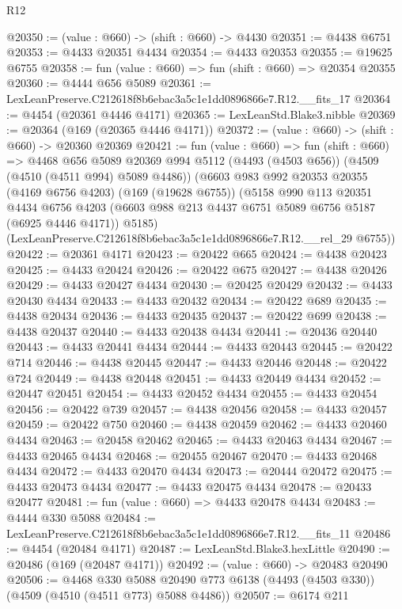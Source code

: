 \begin{lexlean}{R12}
\begin{coremodule}
@20350 := (value : @660) -> (shift : @660) -> @4430
@20351 := @4438 @6751
@20353 := @4433 @20351 @4434
@20354 := @4433 @20353
@20355 := @19625 @6755
@20358 := fun (value : @660) => fun (shift : @660) => @20354 @20355
@20360 := @4444 @656 @5089
@20361 := LexLeanPreserve.C212618f8b6ebac3a5c1e1dd0896866e7.R12.__fits_17
@20364 := @4454 (@20361 @4446 @4171)
@20365 := LexLeanStd.Blake3.nibble
@20369 := @20364 (@169 (@20365 @4446 @4171))
@20372 := (value : @660) -> (shift : @660) -> @20360 @20369
@20421 := fun (value : @660) =>
  fun (shift : @660) =>
  @4468
    @656
    @5089
    @20369
    @994
    @5112
    (@4493 (@4503 @656))
    (@4509 (@4510 (@4511 @994) @5089 @4486))
    (@6603
      @983
      @992
      @20353
      @20355
      (@4169 @6756 @4203)
      (@169 (@19628 @6755))
      (@5158
        @990
        @113
        @20351
        @4434
        @6756
        @4203
        (@6603 @988 @213 @4437 @6751 @5089 @6756 @5187 (@6925 @4446 @4171))
        @5185)
      (LexLeanPreserve.C212618f8b6ebac3a5c1e1dd0896866e7.R12.__rel_29 @6755))
@20422 := @20361 @4171
@20423 := @20422 @665
@20424 := @4438 @20423
@20425 := @4433 @20424
@20426 := @20422 @675
@20427 := @4438 @20426
@20429 := @4433 @20427 @4434
@20430 := @20425 @20429
@20432 := @4433 @20430 @4434
@20433 := @4433 @20432
@20434 := @20422 @689
@20435 := @4438 @20434
@20436 := @4433 @20435
@20437 := @20422 @699
@20438 := @4438 @20437
@20440 := @4433 @20438 @4434
@20441 := @20436 @20440
@20443 := @4433 @20441 @4434
@20444 := @4433 @20443
@20445 := @20422 @714
@20446 := @4438 @20445
@20447 := @4433 @20446
@20448 := @20422 @724
@20449 := @4438 @20448
@20451 := @4433 @20449 @4434
@20452 := @20447 @20451
@20454 := @4433 @20452 @4434
@20455 := @4433 @20454
@20456 := @20422 @739
@20457 := @4438 @20456
@20458 := @4433 @20457
@20459 := @20422 @750
@20460 := @4438 @20459
@20462 := @4433 @20460 @4434
@20463 := @20458 @20462
@20465 := @4433 @20463 @4434
@20467 := @4433 @20465 @4434
@20468 := @20455 @20467
@20470 := @4433 @20468 @4434
@20472 := @4433 @20470 @4434
@20473 := @20444 @20472
@20475 := @4433 @20473 @4434
@20477 := @4433 @20475 @4434
@20478 := @20433 @20477
@20481 := fun (value : @660) => @4433 @20478 @4434
@20483 := @4444 @330 @5088
@20484 := LexLeanPreserve.C212618f8b6ebac3a5c1e1dd0896866e7.R12.__fits_11
@20486 := @4454 (@20484 @4171)
@20487 := LexLeanStd.Blake3.hexLittle
@20490 := @20486 (@169 (@20487 @4171))
@20492 := (value : @660) -> @20483 @20490
@20506 := @4468
    @330
    @5088
    @20490
    @773
    @6138
    (@4493 (@4503 @330))
    (@4509 (@4510 (@4511 @773) @5088 @4486))
@20507 := @6174 @211

\end{coremodule}
\end{lexlean}
